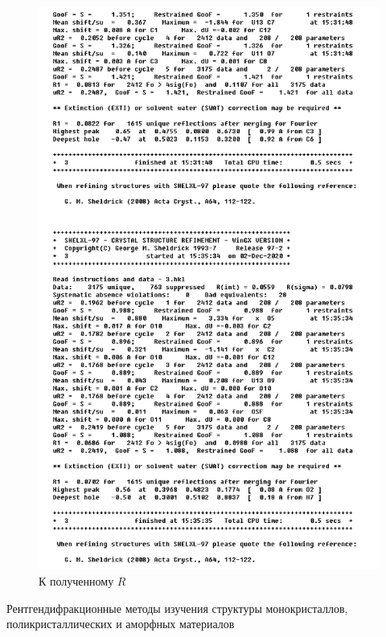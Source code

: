 \documentclass[a4paper, 12pt]{article}
\begin{document}
\begin{figure}[H]
	\centering
	\includegraphics[width=0.6\linewidth]{log}
	\caption{К полученному $R$}
	\label{fig:log}
\end{figure}



\newpage

\begin{thebibliography}{1}
	Рентгендифракционные методы изучения структуры монокристаллов, поликристаллических и аморфных материалов
\end{thebibliography}
\end{document}
